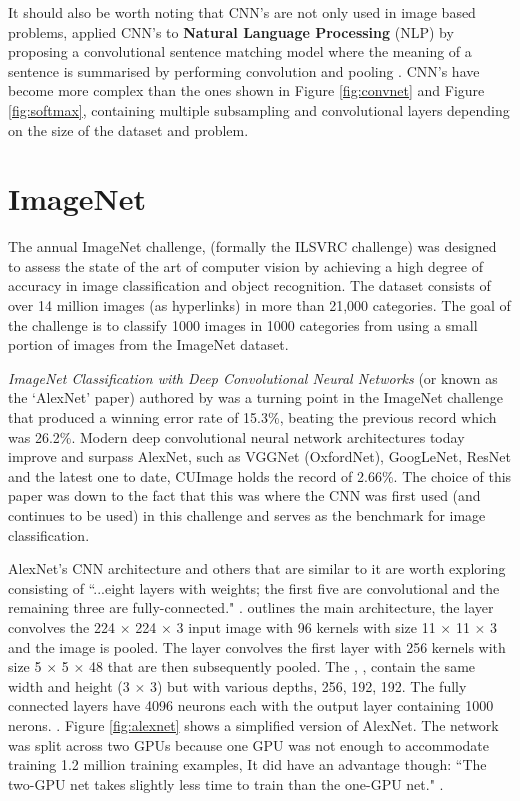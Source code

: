 \documentclass[report, 11pt, oneside]{dissertation}
\begin{document}
It should also be worth noting that CNN's are not only used in image based problems, \citeauthor{Hu:2015uo} applied CNN's to \textbf{Natural Language Processing} (NLP) by proposing a convolutional sentence matching model where the meaning of a sentence is summarised by performing convolution and pooling \citeyearpar{Hu:2015uo}. CNN's have become more complex than the ones shown in Figure \ref{fig:convnet} and Figure \ref{fig:softmax}, containing multiple subsampling and convolutional layers depending on the size of the dataset and problem.

\section{ImageNet}

The annual ImageNet challenge, (formally the ILSVRC challenge) was designed to assess the state of the art of computer vision by achieving a high degree of accuracy in image classification and object recognition. The dataset consists of over 14 million images (as hyperlinks) in more than 21,000 categories. The goal of the challenge is to classify 1000 images in 1000 categories from using a small portion of images from the ImageNet dataset.

\textit{ImageNet Classification with Deep Convolutional Neural Networks} (or known as the `AlexNet' paper) authored by \citep{Krizhevsky2012} was a turning point in the ImageNet challenge that produced a winning error rate of 15.3\%, beating the previous record which was 26.2\%. Modern deep convolutional neural network architectures today improve and surpass AlexNet, such as VGGNet (OxfordNet), GoogLeNet, ResNet and the latest one to date, CUImage holds the record of 2.66\%. The choice of this paper was down to the fact that this was where the CNN was first used (and continues to be used) in this challenge and serves as the benchmark for image classification.

 AlexNet's CNN architecture and others that are similar to it are worth exploring consisting of ``...eight layers with weights; the first five are convolutional and the remaining three are fully-connected." \citep{Krizhevsky2012}. \citeauthor{Krizhevsky2012} outlines the main architecture, the  layer convolves the 224 $ \times $ 224 $ \times $ 3 input image with 96 kernels with size 11 $ \times $ 11 $ \times $ 3 and the image is pooled. The  layer convolves the first layer with 256 kernels with size 5 $ \times $ 5 $ \times $ 48 that are then subsequently pooled. The , ,  contain the same width and height (3 $ \times $ 3) but with various depths, 256, 192, 192. The fully connected layers have 4096 neurons each with the output layer containing 1000 nerons. \citeyearpar{Krizhevsky2012}. Figure \ref{fig:alexnet} shows a simplified version of AlexNet. The network was split across two GPUs because one GPU was not enough to accommodate training 1.2 million training examples, It did have an advantage though: ``The two-GPU net takes slightly less time to train than the one-GPU net." \citep{Krizhevsky2012}.
\end{document}
